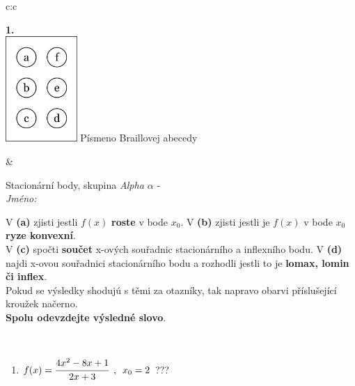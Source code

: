 \documentclass[10pt]{report}
\begin{document}
\begin{tabular}{c:c}
\begin{minipage}[c][104.5mm][t]{0.5\linewidth}
\begin{center}
\begin{minipage}{0.79\linewidth}
\end{minipage}
\begin{minipage}{0.20\linewidth}
\begin{center}
{\Huge\bfseries 1.} \\[2mm]
\includegraphics[height=40mm]{../images/braille.png}
{\small Písmeno Braillovej abecedy}
\end{center}
\end{minipage}
\end{center}
\end{minipage}
&
\begin{minipage}[c][104.5mm][t]{0.5\linewidth}
\begin{center}
\vspace{7mm}
{\huge Stacionární body, skupina \textit{Alpha $\alpha$} -}\\[5mm]
\textit{Jméno:}\phantom{xxxxxxxxxxxxxxxxxxxxxxxxxxxxxxxxxxxxxxxxxxxxxxxxxxxxxxxxxxxxxxxxx}\\[5mm]
\begin{minipage}{0.95\linewidth}
\begin{center}
{\small V \textbf{(a)} zjisti jestli $f(x)$ \textbf{roste} v bode $x_0$. V \textbf{(b)} zjisti jestli je $f(x)$ v bode $x_0$ \textbf{ryze konvexní}.\\V \textbf{(c)} spočti \textbf{součet} x-ových souřadnic stacionárního a inflexního bodu. V \textbf{(d)} najdi x-ovou souřadnici stacionárního bodu a rozhodli jestli to je \textbf{lomax, lomin či inflex}.\\Pokud se výsledky shodujú s těmi za otazníky, tak napravo obarvi příslušející kroužek načerno.\\\textbf{Spolu odevzdejte výsledné slovo}}.
\end{center}
\end{minipage}
\\[1mm]
\begin{minipage}{0.79\linewidth}
\begin{center}
\begin{varwidth}{\linewidth}
\begin{enumerate}
\normalsize
\item $f(x)=\cfrac{4x^2-8x+1}{2x+3}\enspace , \enspace x_0=2$\quad \dotfill\; ???\;\dotfill \quad {}

\end{enumerate}
\end{varwidth}
\end{center}
\end{minipage}
\end{center}
\end{minipage}
\end{tabular}
\end{document}
